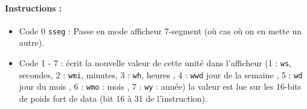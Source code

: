 \documentclass[12pt]{article}
\begin{document}
\paragraph{Instructions :}
\begin{itemize}
\item Code 0 \verb!sseg! : Passe en mode afficheur 7-segment (où cas où on en mette un
  autre).
\item Code 1 - 7 : écrit la nouvelle valeur de cette unité dans l'afficheur (1 :
  \verb!ws!, secondes, 2 : \verb!wmi!, minutes, 3 : \verb!wh!, heures , 4 : \verb!wwd! jour de la
  semaine , 5 : \verb!wd! jour du mois , 6 : \verb!wmo! : mois , 7  : \verb!wy! : année) la valeur est lue sur les 16-bits de poids fort de data (bit 16 à 31
  de l'instruction).
\end{itemize}
\end{document}
